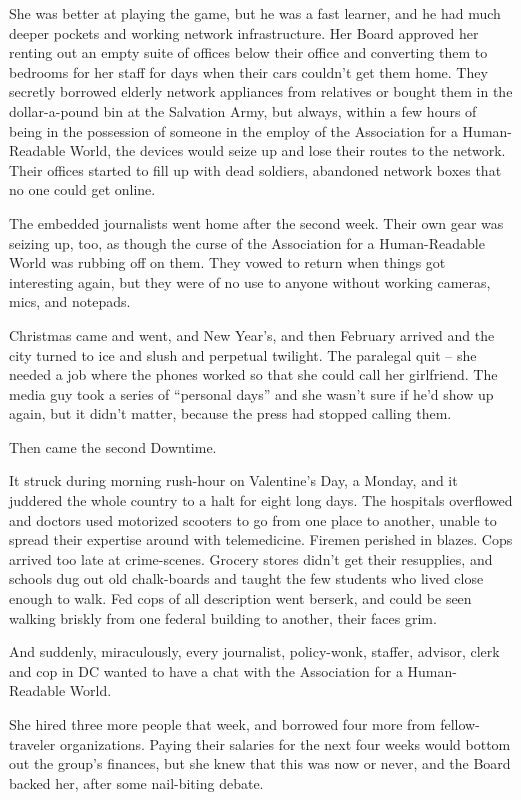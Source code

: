 She was better at playing the game, but he was a fast learner, and he 
had much deeper pockets and working network infrastructure. Her Board 
approved her renting out an empty suite of offices below their office 
and converting them to bedrooms for her staff for days when their cars 
couldn't get them home. They secretly borrowed elderly network 
appliances from relatives or bought them in the dollar-a-pound bin at 
the Salvation Army, but always, within a few hours of being in the 
possession of someone in the employ of the Association for a 
Human-Readable World, the devices would seize up and lose their routes 
to the network. Their offices started to fill up with dead soldiers, 
abandoned network boxes that no one could get online.

The embedded journalists went home after the second week. Their own 
gear was seizing up, too, as though the curse of the Association for a 
Human-Readable World was rubbing off on them. They vowed to return when 
things got interesting again, but they were of no use to anyone without 
working cameras, mics, and notepads.

Christmas came and went, and New Year's, and then February arrived and 
the city turned to ice and slush and perpetual twilight. The paralegal 
quit -- she needed a job where the phones worked so that she could call 
her girlfriend. The media guy took a series of “personal days” and 
she wasn't sure if he'd show up again, but it didn't matter, because 
the press had stopped calling them.

Then came the second Downtime.

It struck during morning rush-hour on Valentine's Day, a Monday, and it 
juddered the whole country to a halt for eight long days. The hospitals 
overflowed and doctors used motorized scooters to go from one place to 
another, unable to spread their expertise around with telemedicine. 
Firemen perished in blazes. Cops arrived too late at crime-scenes. 
Grocery stores didn't get their resupplies, and schools dug out old 
chalk-boards and taught the few students who lived close enough to 
walk. Fed cops of all description went berserk, and could be seen 
walking briskly from one federal building to another, their faces grim.

And suddenly, miraculously, every journalist, policy-wonk, staffer, 
advisor, clerk and cop in DC wanted to have a chat with the Association 
for a Human-Readable World.

\tb

She hired three more people that week, and borrowed four more from 
fellow-traveler organizations. Paying their salaries for the next four 
weeks would bottom out the group's finances, but she knew that this was 
now or never, and the Board backed her, after some nail-biting debate.

